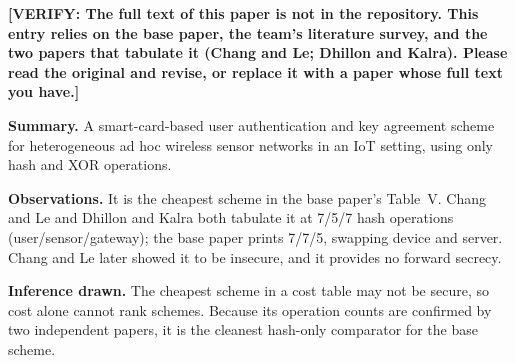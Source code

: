 \documentclass[12pt,a4paper,oneside]{report}
\numberwithin{equation}{chapter}
\newcommand{\VERIFY}[1]{\textcolor{orange!85!black}{\textbf{[VERIFY: #1]}}}
\begin{document}
\noindent\VERIFY{The full text of this paper is not in the repository. This entry relies on the base paper, the team's literature survey, and the two papers that tabulate it (Chang and Le; Dhillon and Kalra). Please read the original and revise, or replace it with a paper whose full text you have.}

\noindent\textbf{Summary.} A smart-card-based user authentication and key agreement scheme for heterogeneous ad hoc wireless sensor networks in an IoT setting, using only hash and XOR operations.

\noindent\textbf{Observations.} It is the cheapest scheme in the base paper's Table~V. Chang and Le and Dhillon and Kalra both tabulate it at 7/5/7 hash operations (user/sensor/gateway); the base paper prints 7/7/5, swapping device and server. Chang and Le later showed it to be insecure, and it provides no forward secrecy.

\noindent\textbf{Inference drawn.} The cheapest scheme in a cost table may not be secure, so cost alone cannot rank schemes. Because its operation counts are confirmed by two independent papers, it is the cleanest hash-only comparator for the base scheme.
\end{document}

